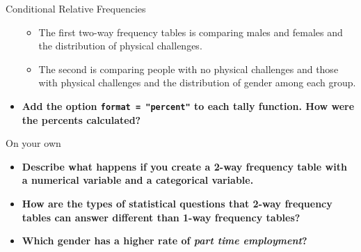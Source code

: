 \documentclass[
  ignorenonframetext,
]{beamer}
\providecommand{\tightlist}{%
  \setlength{\itemsep}{0pt}\setlength{\parskip}{0pt}}
\begin{document}
\begin{frame}[fragile]{Conditional Relative Frequencies}
\begin{itemize}
  \begin{itemize}
  \tightlist
  \item
    The first two-way frequency tables is comparing males and females
    and the distribution of physical challenges.
  \item
    The second is comparing people with no physical challenges and those
    with physical challenges and the distribution of gender among each
    group.
  \end{itemize}
\item
  \textbf{Add the option \texttt{format\ =\ "percent"} to each tally
  function. How were the percents calculated?}
\end{itemize}

\end{frame}

\begin{frame}{On your own}
\protect\hypertarget{on-your-own}{}

\begin{itemize}
\tightlist
\item
  \textbf{Describe what happens if you create a 2-way frequency table
  with a numerical variable and a categorical variable.}
\item
  \textbf{How are the types of statistical questions that 2-way
  frequency tables can answer different than 1-way frequency tables?}
\item
  \textbf{Which gender has a higher rate of \emph{part time
  employment}?}
\end{itemize}

\end{frame}
\end{document}
